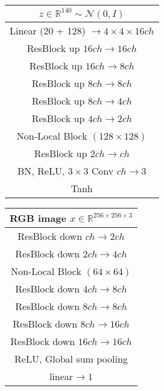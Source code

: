 \documentclass[10pt,twocolumn,letterpaper]{article}
\begin{document}
\begin{table*}[t]
	\begin{minipage}[t]{.45\textwidth}
	\centering
	\begin{tabular}{c}
		\hline 	\hline
		$z \in \mathbb{R}^{140} \sim \mathcal{N}(0,I)$ \\
		\hline
		Linear (20 + 128) $\rightarrow 4 \times 4 \times 16ch$ \\
		\hline
		ResBlock up $16ch \rightarrow  16ch$ \\
		\hline
		ResBlock up $16ch \rightarrow  8ch$ \\
		\hline
		ResBlock up $8ch \rightarrow  8ch$ \\
		\hline
		ResBlock up $8ch \rightarrow  4ch$ \\
		\hline
		ResBlock up $4ch \rightarrow  2ch$ \\
		\hline
		Non-Local Block $(128 \times 128)$ \\
		\hline
		ResBlock up $2ch \rightarrow  ch$ \\
		\hline
		BN, ReLU, $3 \times 3$ Conv $ch \rightarrow 3 $ \\
		\hline
		Tanh \\
		\hline 	\hline
	\end{tabular}
\end{minipage}  \hspace{0.5cm}
	\begin{minipage}[t]{.45\textwidth}
	\centering
	\begin{tabular}{c}
	\hline 	\hline
    RGB image $x \in \mathbb{R}^{256 \times 256 \times 3}$ \\
	\hline
	ResBlock down $ch \rightarrow  2ch$ \\
	\hline
	ResBlock down $2ch \rightarrow  4ch$ \\
	\hline
	Non-Local Block $(64 \times 64)$ \\
	\hline
	ResBlock down $4ch \rightarrow  8ch$ \\
	\hline
	ResBlock down $8ch \rightarrow  8ch$ \\
	\hline
	ResBlock down $8ch \rightarrow  16ch$ \\
	\hline
	ResBlock down $16ch \rightarrow 16ch$ \\
	\hline
	ReLU, Global sum pooling \\
	\hline
	linear$\rightarrow 1$\\
	\hline 	\hline
     \end{tabular}
\end{minipage} \hspace{0.5cm}	


    \caption{The BigGAN~\cite{Brock2019} generator and discriminator architectures for class-conditional and unconditional tasks of generating images at different resolutions. Top (a and b): The class-conditional BigGAN model for resolution $128\times128$. Bottom (c and d): The BigGAN model for resolution $256\times 256$, modified to be \textit{un}conditional.} \label{table:supp_biggan_arch} \end{table*}
\end{document}
